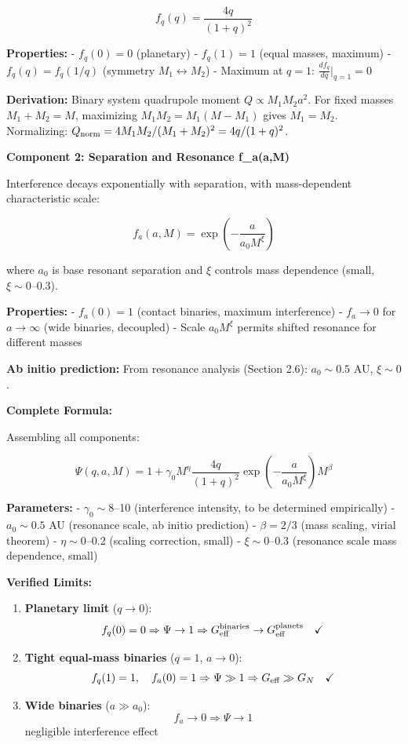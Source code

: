 \documentclass[11pt,a4paper]{article}
\begin{document}
\[f_q(q) = \frac{4q}{(1+q)^2}\]

\textbf{Properties:} - \(f_q(0) = 0\) (planetary) - \(f_q(1) = 1\)
(equal masses, maximum) - \(f_q(q) = f_q(1/q)\) (symmetry
\(M_1 \leftrightarrow M_2\)) - Maximum at \(q=1\):
\(\frac{df_q}{dq}\Big|_{q=1} = 0\)

\textbf{Derivation:} Binary system quadrupole moment
\(Q \propto M_1 M_2 a^2\). For fixed masses \(M_1+M_2 = M\), maximizing
\(M_1 M_2 = M_1(M-M_1)\) gives \(M_1 = M_2\). Normalizing:
\(Q_{\rm norm} = 4 M_1 M_2/(M_1+M_2)^2 = 4q/(1+q)^2\).

\textbf{Component 2: Separation and Resonance f\_a(a,M)}

Interference decays exponentially with separation, with mass-dependent
characteristic scale:

\[f_a(a,M) = \exp\left(-\frac{a}{a_0 M^\xi}\right)\]

where \(a_0\) is base resonant separation and \(\xi\) controls mass
dependence (small, \(\xi \sim 0\)--0.3).

\textbf{Properties:} - \(f_a(0) = 1\) (contact binaries, maximum
interference) - \(f_a \to 0\) for \(a \to \infty\) (wide binaries,
decoupled) - Scale \(a_0 M^\xi\) permits shifted resonance for different
masses

\textbf{Ab initio prediction:} From resonance analysis (Section 2.6):
\(a_0 \sim 0.5\) AU, \(\xi \sim 0\).

\textbf{Complete Formula:}

Assembling all components:

\[\boxed{\Psi(q,a,M) = 1 + \gamma_0 M^\eta \frac{4q}{(1+q)^2} \exp\left(-\frac{a}{a_0 M^\xi}\right) M^\beta}\]

\textbf{Parameters:} - \(\gamma_0 \sim 8\)--10 (interference intensity,
to be determined empirically) - \(a_0 \sim 0.5\) AU (resonance scale, ab
initio prediction) - \(\beta = 2/3\) (mass scaling, virial theorem) -
\(\eta \sim 0\)--0.2 (scaling correction, small) - \(\xi \sim 0\)--0.3
(resonance scale mass dependence, small)

\textbf{Verified Limits:}

\begin{enumerate}
\def\labelenumi{\arabic{enumi}.}
\item
  \textbf{Planetary limit} (\(q \to 0\)):
  \[f_q(0) = 0 \Rightarrow \Psi \to 1 \Rightarrow G_{\rm eff}^{\rm binaries} \to G_{\rm eff}^{\rm planets} \quad \checkmark{}\]
\item
  \textbf{Tight equal-mass binaries} (\(q=1\), \(a \to 0\)):
  \[f_q(1) = 1, \quad f_a(0) = 1 \Rightarrow \Psi \gg 1 \Rightarrow G_{\rm eff} \gg G_N \quad \checkmark{}\]
\item
  \textbf{Wide binaries} (\(a \gg a_0\)):
  \[f_a \to 0 \Rightarrow \Psi \to 1\] negligible interference effect \checkmark{}
\end{enumerate}
\end{document}
